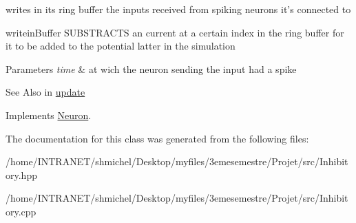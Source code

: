 writes in its ring buffer the inputs received from spiking neurons it's connected to 

writein\-Buffer S\-U\-B\-S\-T\-R\-A\-C\-T\-S an current at a certain index in the ring buffer for it to be added to the potential latter in the simulation 
\begin{DoxyParams}{Parameters}
{\em time} & at wich the neuron sending the input had a spike \\
\hline
\end{DoxyParams}
\begin{DoxySeeAlso}{See Also}
in \hyperlink{classNeuron_ade349102c17d508352a1061798083ba2}{update} 
\end{DoxySeeAlso}


Implements \hyperlink{classNeuron_a41c979859ae91f8f80d58b2d01e1421e}{Neuron}.



The documentation for this class was generated from the following files\-:\begin{DoxyCompactItemize}
\item 
/home/\-I\-N\-T\-R\-A\-N\-E\-T/shmichel/\-Desktop/myfiles/3emesemestre/\-Projet/src/Inhibitory.\-hpp\item 
/home/\-I\-N\-T\-R\-A\-N\-E\-T/shmichel/\-Desktop/myfiles/3emesemestre/\-Projet/src/Inhibitory.\-cpp\end{DoxyCompactItemize}
